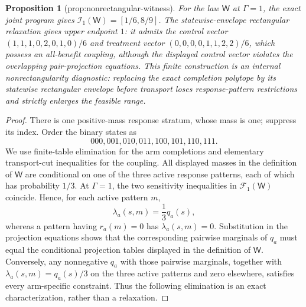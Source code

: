 \documentclass{article}
\newtheorem{proposition}{Proposition}
\begin{document}
\begin{proposition}[prop:nonrectangular-witness]\label{prop:nonrectangular-witness}
For the law \(\mathsf W\) at \(\Gamma=1\), the exact joint program gives \(\mathcal I_1(\mathsf W)=[1/6,8/9]\). The statewise-envelope rectangular relaxation gives upper endpoint \(1\): it admits the control vector \((1,1,1,0,2,0,1,0)/6\) and treatment vector \((0,0,0,0,1,1,2,2)/6\), which possess an all-benefit coupling, although the displayed control vector violates the overlapping pair-projection equations. This finite construction is an internal nonrectangularity diagnostic: replacing the exact completion polytope by its statewise rectangular envelope before transport loses response-pattern restrictions and strictly enlarges the feasible range.
\end{proposition}
\begin{proof}
There is one positive-mass response stratum, whose mass is one; suppress its index.  Order the binary states as
\[
000,001,010,011,100,101,110,111.
\]
We use finite-table elimination for the arm completions and elementary transport-cut inequalities for the coupling.  All displayed masses in the definition of \(\mathsf W\) are conditional on one of the three active response patterns, each of which has probability \(1/3\).  At \(\Gamma=1\), the two sensitivity inequalities in \(\mathcal F_1(\mathsf W)\) coincide.  Hence, for each active pattern \(m\),
\[
\lambda_a(s,m)=\frac{1}{3}q_a(s),
\]
whereas a pattern having \(r_a(m)=0\) has \(\lambda_a(s,m)=0\).  Substitution in the projection equations shows that the corresponding pairwise marginals of \(q_a\) must equal the conditional projection tables displayed in the definition of \(\mathsf W\).  Conversely, any nonnegative \(q_a\) with those pairwise marginals, together with \(\lambda_a(s,m)=q_a(s)/3\) on the three active patterns and zero elsewhere, satisfies every arm-specific constraint.  Thus the following elimination is an exact characterization, rather than a relaxation.


\end{proof}
\end{document}
